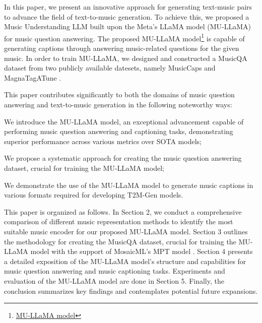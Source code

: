 \documentclass{article}
\begin{document}
In this paper, we present an innovative approach for generating text-music pairs to advance the field of text-to-music generation. To achieve this, we proposed a Music Understanding LLM built upon the Meta's LLaMA \cite{touvron2023llama, touvron2023llama2} model (MU-LLaMA) for music question answering. The proposed MU-LLaMA model\footnote{\href{https://github.com/crypto-code/MU-LLaMA}{MU-LLaMA model}} is capable of generating captions through answering music-related questions for the given music. In order to train MU-LLaMA, we designed and constructed a MusicQA dataset from two publicly available datesets, namely MusicCaps \cite{agostinelli2023musiclm} and MagnaTagATune \cite{9aed49b956a24e99b044582665fd5b21}.

This paper contributes significantly to both the domains of music question answering and text-to-music generation in the following noteworthy ways:
\begingroup
\renewcommand\labelenumi{ \textbf{\theenumi)}}
\begin{enumerate*}
    \setlength{\itemsep}{2mm}
    \item We introduce the MU-LLaMA model, an exceptional advancement capable of performing music question answering and captioning tasks, demonstrating superior performance across various metrics over SOTA models;

    \item We propose a systematic approach for creating the music question answering dataset, crucial for training the MU-LLaMA model;

    \item We demonstrate the use of the MU-LLaMA model to generate music captions in various formats required for developing T2M-Gen models.
\end{enumerate*}
\endgroup


This paper is organized as follows. In Section 2, we conduct a comprehensive comparison of different music representation methods to identify the most suitable music encoder for our proposed MU-LLaMA model. Section 3 outlines the methodology for creating the MusicQA dataset, crucial for training the MU-LLaMA model with the support of MosaicML's MPT model \cite{MosaicML2023Introducing}. Section 4 presents a detailed exposition of the MU-LLaMA model's structure and capabilities for music question answering and music captioning tasks. Experiments and evaluation of the MU-LLaMA model are done in Section 5. Finally, the conclusion summarizes key findings and contemplates potential future expansions.
\end{document}
